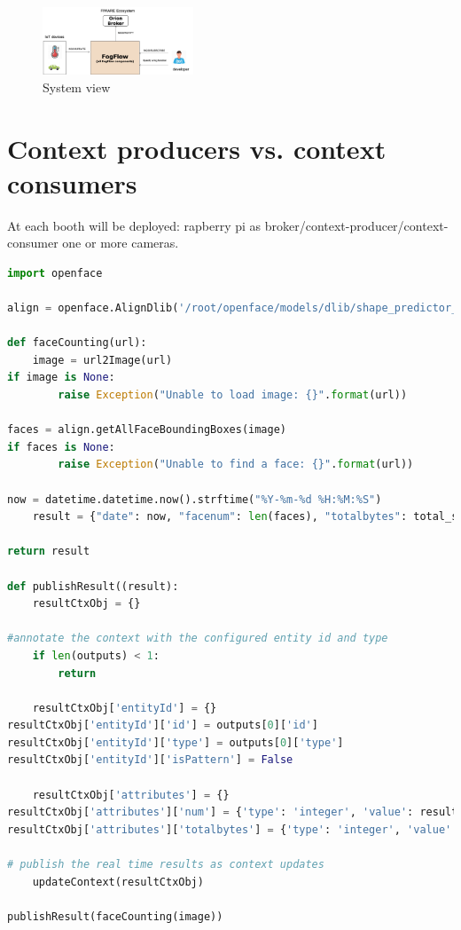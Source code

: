 \documentclass[conference]{ieeeconf}
\begin{document}
    \begin{figure}[h]
        \centering
        \includegraphics[width=0.4\textwidth]{Images/systemview.png}
        \caption{System view}
    \end{figure}{}


    \section{Context producers vs. context consumers}
    At each booth will be deployed:
    rapberry pi as broker/context-producer/context-consumer
    one or more cameras.

    \begin{lstlisting}[language=Python]
import openface

align = openface.AlignDlib('/root/openface/models/dlib/shape_predictor_68_face_landmarks.dat')

def faceCounting(url):     
    image = url2Image(url)
if image is None:
        raise Exception("Unable to load image: {}".format(url))

faces = align.getAllFaceBoundingBoxes(image)
if faces is None:
        raise Exception("Unable to find a face: {}".format(url))

now = datetime.datetime.now().strftime("%Y-%m-%d %H:%M:%S")
    result = {"date": now, "facenum": len(faces), "totalbytes": total_size}

return result
    
def publishResult((result):
    resultCtxObj = {}

#annotate the context with the configured entity id and type
    if len(outputs) < 1:
        return   
    
    resultCtxObj['entityId'] = {}
resultCtxObj['entityId']['id'] = outputs[0]['id']
resultCtxObj['entityId']['type'] = outputs[0]['type']
resultCtxObj['entityId']['isPattern'] = False
    
    resultCtxObj['attributes'] = {}
resultCtxObj['attributes']['num'] = {'type': 'integer', 'value': result['facenum']}
resultCtxObj['attributes']['totalbytes'] = {'type': 'integer', 'value': result['totalbytes']}

# publish the real time results as context updates
    updateContext(resultCtxObj)

publishResult(faceCounting(image))
    \end{lstlisting}
\end{document}
